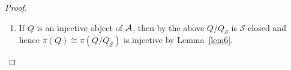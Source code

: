 \documentclass[dissertation.tex]{subfiles}
\begin{document}
\begin{cor}
\begin{proof}
\begin{enumerate}
    \item
      If $Q$ is an injective object of $\mathcal{A}$, then by the above $Q/Q_\mathcal{S}$ is $\mathcal{S}$-closed and hence $\pi(Q) \cong \pi(Q/Q_\mathcal{S})$ is injective by Lemma~\ref{lem6}.
      
      

\end{enumerate}
\end{proof}
\end{cor}
\end{document}
